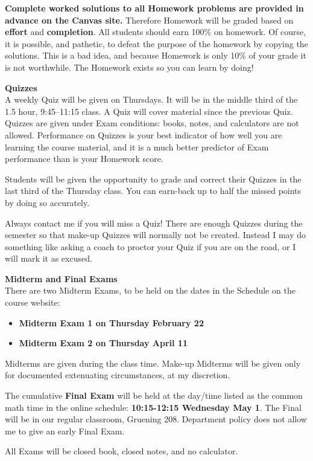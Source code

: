\documentclass[12pt]{article}
\renewcommand{\emph}[1]{\textsf{\textbf{#1}}}
\newcommand{\localhead}[1]{\par\smallskip\textbf{#1} \smallskip\nobreak\\}%
\def\heading#1{\localhead{\large\emph{#1}}}
\begin{document}
\emph{Complete worked solutions to all Homework problems are provided in advance on the Canvas site.}  Therefore Homework will be graded based on \emph{effort} and \emph{completion}.  All students should earn 100\% on homework.  Of course, it is possible, and pathetic, to defeat the purpose of the homework by copying the solutions.  This is a bad idea, and because Homework is only 10\% of your grade it is not worthwhile.  The Homework exists so you can learn by doing!


\heading{Quizzes}
A weekly Quiz will be given on Thursdays.  It will be in the middle third of the 1.5 hour, 9:45--11:15 class.  A Quiz will cover material since the previous Quiz.  Quizzes are given under Exam conditions: books, notes, and calculators are not allowed.  Performance on Quizzes is your best indicator of how well you are learning the course material, and it is a much better predictor of Exam performance than is your Homework score.

Students will be given the opportunity to grade and correct their Quizzes in the last third of the Thursday class.  You can earn-back up to half the missed points by doing so accurately.

Always contact me if you will miss a Quiz!  There are enough Quizzes during the semester so that make-up Quizzes will normally not be created.  Instead I may do something like asking a coach to proctor your Quiz if you are on the road, or I will mark it as excused. 


\heading{Midterm and Final Exams}
There are two Midterm Exams, to be held on the dates in the Schedule on the course website:
\begin{itemize}
\item \emph{Midterm Exam 1 on Thursday February 22}
\item \emph{Midterm Exam 2 on Thursday April 11}
\end{itemize}
Midterms are given during the class time.  Make-up Midterms will be given only for documented extenuating circumstances, at my discretion.

The cumulative \emph{Final Exam} will be held at the day/time listed as the common math time in the online schedule: \emph{10:15-12:15 Wednesday May 1}.  The Final will be in our regular classroom, Gruening 208.  Department policy does not allow me to give an early Final Exam.

All Exams will be closed book, closed notes, and no calculator.
\end{document}
